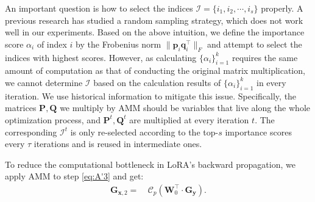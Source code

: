 An important question is how to select the indices $\mathcal{I}=\{i_1,i_2,\cdots,i_s\}$ properly. A previous research \citep{drineas2006fast} has studied a random sampling strategy, which does not work well in our experiments. Based on the above intuition, we define the importance score $\alpha_i$ of index $i$ by the Frobenius norm $\|\mathbf{p}_i\mathbf{q}_i^\top\|_F$ and attempt to select the indices with highest scores. However, as calculating $\{\alpha_i\}_{i=1}^k$ requires the same amount of computation as that of conducting the original matrix multiplication, we cannot determine $\mathcal{I}$ based on the calculation results of $\{\alpha_i\}_{i=1}^k$ in every iteration. We use historical information to mitigate this issue. Specifically, the matrices $\mathbf{P},\mathbf{Q}$ we multiply by AMM should be variables that live along the whole optimization process, and $\mathbf{P}^t,\mathbf{Q}^t$ are multiplied at every iteration $t$. The corresponding $\mathcal{I}^t$ is only re-selected according to the top-$s$ importance scores every $\tau$ iterations and is reused in intermediate ones.


To reduce the computational bottleneck in LoRA's backward propagation, we apply AMM to step \eqref{eq:A'3} and get:
\begin{align}
\mathbf{G}_{\mathbf{x},2}=&\ \mathcal{C}_p(\mathbf{W}_0^\top\cdot \mathbf{G}_\mathbf{y}).\label{eq:A''3}
\end{align}




